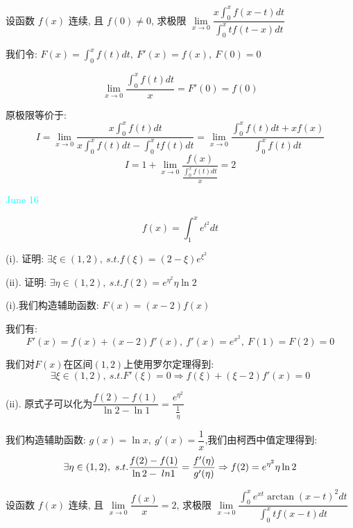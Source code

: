 \begin{example}[][Exam: 32.3.2]
	设函数 $f(x)$ 连续, 且 $f(0)\neq 0$, 求极限 $\lim\limits_{x\to 0}\dfrac{x\int_{0}^{x}f(x-t)dt}{\int_{0}^{x}tf(t-x)dt}$
\end{example}

\begin{solution}
	
	我们令: $F(x)=\int_{0}^{x}f(t)dt,\ F'(x)=f(x),\ F(0)=0$
	
	$$\lim\limits_{x\to 0}\dfrac{\int_{0}^{x}f(t)dt}{x}=F'(0)=f(0)$$
	
	原极限等价于: 
	$$I=\lim\limits_{x\to 0}\dfrac{x\int_{0}^{x}f(t)dt}{x\int_{0}^{x}f(t)dt-\int_{0}^{x}tf(t)dt}=\lim\limits_{x\to 0}\dfrac{\int_{0}^{x}f(t)dt+xf(x)}{\int_{0}^{x}f(t)dt}$$
	$$I=1+\lim\limits_{x\to 0}\dfrac{f(x)}{\frac{\int_{0}^{x}f(t)dt}{x}}=2$$
\end{solution}


\textcolor{cyan}{June 16}

\begin{example}[][Exam: 32.3.3]
	$$f(x)=\int_{1}^{x}e^{t^2}dt$$

(i). 证明: $\exists \xi\in(1,2),\ s.t. f(\xi)=(2-\xi)e^{\xi^2}$

(ii). 证明: $\exists \eta \in(1,2),\ s.t. f(2)= e^{\eta^2}\eta \ln 2$
\end{example}

\begin{solution}
	
	(i).我们构造辅助函数: $F(x)=(x-2)f(x)$
	
	我们有: $$F'(x)=f(x)+(x-2)f'(x),\ f'(x)=e^{x^2},\ F(1)=F(2)=0$$
	
	我们对$F(x)$在区间$(1,2)$上使用罗尔定理得到: 
	$$\exists \xi\in(1,2),\ s.t. F'(\xi)=0\Rightarrow f(\xi)+(\xi-2)f'(x)=0$$
	
	(ii). 原式子可以化为$\dfrac{f(2)-f(1)}{\ln 2-\ln 1}=\dfrac{e^{\eta^2}}{\frac{1}{\eta}}$
	
	我们构造辅助函数: $g(x)=\ln x,\ g'(x)=\dfrac{1}{x}$,我们由柯西中值定理得到: 
	$$\exists \eta\in(1,2),\ s.t. \dfrac{f(2)-f(1)}{\ln 2-\\ln 1}=\dfrac{f'(\eta)}{g'(\eta)}\Rightarrow f(2)=e^{\eta^2}\eta \ln 2$$
\end{solution}

\begin{example}[][Exam: 32.3.4]
	设函数 $f(x)$ 连续, 且 $\lim\limits_{x\to 0}\dfrac{f(x)}{x}=2$, 
	求极限 $\lim\limits_{x\to 0}\dfrac{\int_{0}^{x}e^{xt}\arctan(x-t)^2dt}{\int_{0}^{x}tf(x-t)dt}$
\end{example}


